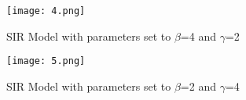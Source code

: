 \documentclass[apj]{emulateapj}
\begin{document}
\begin{figure} 
\texttt{[image: 4.png]}
\caption{SIR Model with parameters set to $\beta$=4 and $\gamma$=2}
\label{fig:figureOfSpectrum}
\end{figure}

\begin{figure} 
\texttt{[image: 5.png]}
\caption{SIR Model with parameters set to $\beta$=2 and $\gamma$=4}
\label{fig:figureOfSpectrum}
\end{figure}



\end{document}
